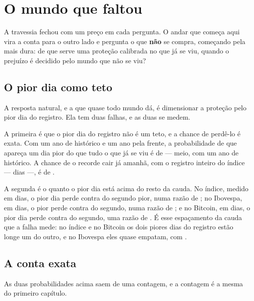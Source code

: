 \chapter{O mundo que faltou}\label{cap:faltou}

A travessia fechou com um preço em cada pergunta. O andar que começa aqui vira a conta para o outro
lado e pergunta o que \textbf{não} se compra, começando pela mais dura: de que serve uma proteção
calibrada no que já se viu, quando o prejuízo é decidido pelo mundo que não se viu?

\section{O pior dia como teto}

A resposta natural, e a que quase todo mundo dá, é dimensionar a proteção pelo pior dia do registro.
Ela tem duas falhas, e as duas se medem.

A primeira é que o pior dia do registro não é um teto, e a chance de perdê-lo é exata. Com um ano de
histórico e um ano pela frente, a probabilidade de que apareça um dia pior do que tudo o que já se
viu é de \numRecordeProbabilidade{} --- meio, com um ano de histórico. A chance de o recorde cair já
amanhã, com o registro inteiro do índice --- \numRecordeIndiceDias{} dias ---, é de
\numRecordeDoProximo{}.

A segunda é o quanto o pior dia está acima do resto da cauda. No índice, medido em \numRecordeIndiceDias{} dias, o pior dia perde \numRecordeIndicePior{} contra
\numRecordeIndiceSegundo{} do segundo pior, numa razão de \numRecordeIndiceRazao{}; no Ibovespa, em
\numRecordeIbovespaDias{} dias, o pior perde \numRecordeIbovespaPior{} contra
\numRecordeIbovespaSegundo{} do segundo, numa razão de \numRecordeIbovespaRazao{}; e no Bitcoin, em
\numRecordeBitcoinDias{} dias, o pior dia perde \numRecordeBitcoinPior{} contra
\numRecordeBitcoinSegundo{} do segundo, uma razão de \numRecordeBitcoinRazao{}. É esse espaçamento da cauda que a falha mede: no
índice e no Bitcoin os dois piores dias do registro estão longe um do outro, e no Ibovespa eles quase
empatam, com \numRecordeIbovespaRazao{}.

\section{A conta exata}

As duas probabilidades acima saem de uma contagem, e a contagem é a mesma do primeiro capítulo.

